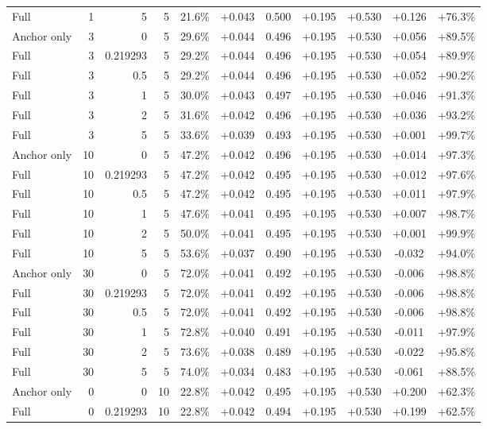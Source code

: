 \begin{table}[htbp]
\begin{tabular}{lrrrccccccc}
Full & 1 & 5 & 5 & 21.6\% & +0.043 & 0.500 & +0.195 & +0.530 & +0.126 & +76.3\% \\
Anchor only & 3 & 0 & 5 & 29.6\% & +0.044 & 0.496 & +0.195 & +0.530 & +0.056 & +89.5\% \\
Full & 3 & 0.219293 & 5 & 29.2\% & +0.044 & 0.496 & +0.195 & +0.530 & +0.054 & +89.9\% \\
Full & 3 & 0.5 & 5 & 29.2\% & +0.044 & 0.496 & +0.195 & +0.530 & +0.052 & +90.2\% \\
Full & 3 & 1 & 5 & 30.0\% & +0.043 & 0.497 & +0.195 & +0.530 & +0.046 & +91.3\% \\
Full & 3 & 2 & 5 & 31.6\% & +0.042 & 0.496 & +0.195 & +0.530 & +0.036 & +93.2\% \\
Full & 3 & 5 & 5 & 33.6\% & +0.039 & 0.493 & +0.195 & +0.530 & +0.001 & +99.7\% \\
Anchor only & 10 & 0 & 5 & 47.2\% & +0.042 & 0.496 & +0.195 & +0.530 & +0.014 & +97.3\% \\
Full & 10 & 0.219293 & 5 & 47.2\% & +0.042 & 0.495 & +0.195 & +0.530 & +0.012 & +97.6\% \\
Full & 10 & 0.5 & 5 & 47.2\% & +0.042 & 0.495 & +0.195 & +0.530 & +0.011 & +97.9\% \\
Full & 10 & 1 & 5 & 47.6\% & +0.041 & 0.495 & +0.195 & +0.530 & +0.007 & +98.7\% \\
Full & 10 & 2 & 5 & 50.0\% & +0.041 & 0.495 & +0.195 & +0.530 & +0.001 & +99.9\% \\
Full & 10 & 5 & 5 & 53.6\% & +0.037 & 0.490 & +0.195 & +0.530 & -0.032 & +94.0\% \\
Anchor only & 30 & 0 & 5 & 72.0\% & +0.041 & 0.492 & +0.195 & +0.530 & -0.006 & +98.8\% \\
Full & 30 & 0.219293 & 5 & 72.0\% & +0.041 & 0.492 & +0.195 & +0.530 & -0.006 & +98.8\% \\
Full & 30 & 0.5 & 5 & 72.0\% & +0.041 & 0.492 & +0.195 & +0.530 & -0.006 & +98.8\% \\
Full & 30 & 1 & 5 & 72.8\% & +0.040 & 0.491 & +0.195 & +0.530 & -0.011 & +97.9\% \\
Full & 30 & 2 & 5 & 73.6\% & +0.038 & 0.489 & +0.195 & +0.530 & -0.022 & +95.8\% \\
Full & 30 & 5 & 5 & 74.0\% & +0.034 & 0.483 & +0.195 & +0.530 & -0.061 & +88.5\% \\
Anchor only & 0 & 0 & 10 & 22.8\% & +0.042 & 0.495 & +0.195 & +0.530 & +0.200 & +62.3\% \\
Full & 0 & 0.219293 & 10 & 22.8\% & +0.042 & 0.494 & +0.195 & +0.530 & +0.199 & +62.5\% \\

\end{tabular}
\end{table}
